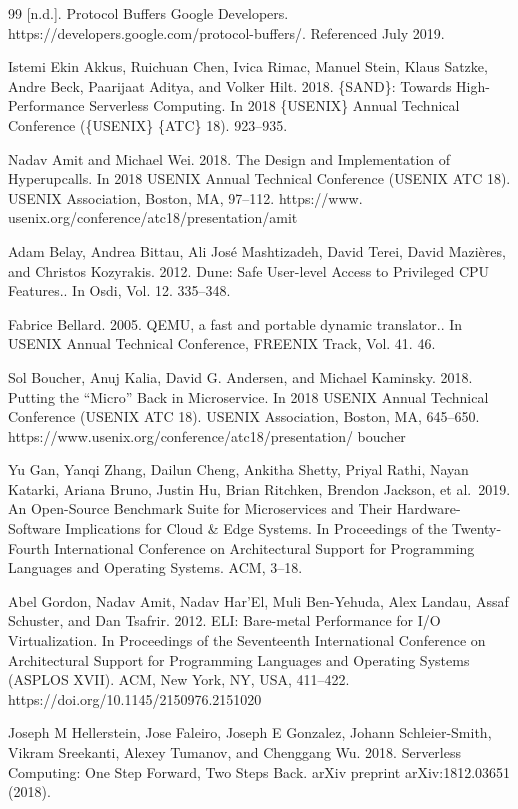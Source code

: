 \begin{thebibliography}{99}
 {[}n.d.{]}. Protocol Buffers Google Developers. https://developers.google.com/protocol-buffers/. Referenced July 2019.

 Istemi Ekin Akkus, Ruichuan Chen, Ivica Rimac, Manuel Stein, Klaus Satzke, Andre Beck, Paarijaat Aditya, and Volker Hilt. 2018. \{SAND\}: Towards High-Performance Serverless Computing. In 2018 \{USENIX\} Annual Technical Conference (\{USENIX\} \{ATC\} 18). 923--935.

 Nadav Amit and Michael Wei. 2018. The Design and Implementation of Hyperupcalls. In 2018 USENIX Annual Technical Conference (USENIX ATC 18). USENIX Association, Boston, MA, 97--112. https://www. usenix.org/conference/atc18/presentation/amit

 Adam Belay, Andrea Bittau, Ali José Mashtizadeh, David Terei, David Mazières, and Christos Kozyrakis. 2012. Dune: Safe User-level Access to Privileged CPU Features.. In Osdi, Vol. 12. 335--348.

 Fabrice Bellard. 2005. QEMU, a fast and portable dynamic translator.. In USENIX Annual Technical Conference, FREENIX Track, Vol. 41. 46.

 Sol Boucher, Anuj Kalia, David G. Andersen, and Michael Kaminsky. 2018. Putting the ``Micro'' Back in Microservice. In 2018 USENIX Annual Technical Conference (USENIX ATC 18). USENIX Association, Boston, MA, 645--650. https://www.usenix.org/conference/atc18/presentation/ boucher

 Yu Gan, Yanqi Zhang, Dailun Cheng, Ankitha Shetty, Priyal Rathi, Nayan Katarki, Ariana Bruno, Justin Hu, Brian Ritchken, Brendon Jackson, et al.~2019. An Open-Source Benchmark Suite for Microservices and Their Hardware-Software Implications for Cloud \& Edge Systems. In Proceedings of the Twenty-Fourth International Conference on Architectural Support for Programming Languages and Operating Systems. ACM, 3--18.

 Abel Gordon, Nadav Amit, Nadav Har'El, Muli Ben-Yehuda, Alex Landau, Assaf Schuster, and Dan Tsafrir. 2012. ELI: Bare-metal Performance for I/O Virtualization. In Proceedings of the Seventeenth International Conference on Architectural Support for Programming Languages and Operating Systems (ASPLOS XVII). ACM, New York, NY, USA, 411--422. https://doi.org/10.1145/2150976.2151020

 Joseph M Hellerstein, Jose Faleiro, Joseph E Gonzalez, Johann Schleier-Smith, Vikram Sreekanti, Alexey Tumanov, and Chenggang Wu. 2018. Serverless Computing: One Step Forward, Two Steps Back. arXiv preprint arXiv:1812.03651 (2018).


\end{thebibliography}
